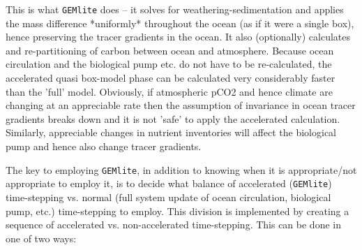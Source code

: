 This is what \texttt{GEMlite} does -- it solves for weathering-sedimentation and applies the mass difference *uniformly* throughout the ocean (as if it were a single box), hence preserving the tracer gradients in the ocean. It also (optionally) calculates and re-partitioning of carbon between ocean and atmosphere. Because ocean circulation and the biological pump etc. do not have to be re-calculated, the accelerated quasi box-model phase can be calculated very considerably faster than the 'full' model.
Obviously, if atmospheric pCO2 and hence climate are changing at an appreciable rate then the assumption of invariance in ocean tracer gradients breaks down and it is not 'safe' to apply the accelerated calculation. Similarly, appreciable changes in nutrient inventories will affect the biological pump and hence also change tracer gradients.

The key to employing \texttt{GEMlite}, in addition to knowing when it is appropriate/not appropriate to employ it, is to decide what balance of accelerated (\texttt{GEMlite}) time-stepping vs. normal (full system update of ocean circulation, biological pump, etc.) time-stepping to employ. This division is implemented by creating a sequence of accelerated vs. non-accelerated time-stepping. This can be done in one of two ways:

